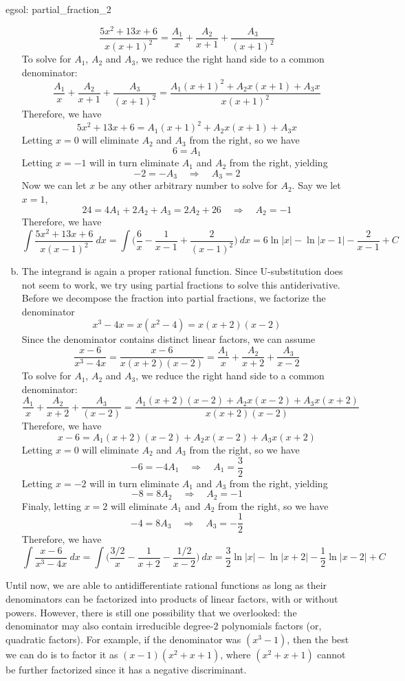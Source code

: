 \begin{egsol}[]{egsol: partial_fraction_2}
\begin{enumerate}[a)]
        \[\frac{5x^2+13x+6}{x(x+1)^2} = \frac{A_1}{x} + \frac{A_2}{x+1} + \frac{A_3}{(x+1)^2}\]
        To solve for $A_1$, $A_2$ and $A_3$, we reduce the right hand side to a common denominator:
        \[\frac{A_1}{x} + \frac{A_2}{x+1} + \frac{A_3}{(x+1)^2} = \frac{A_1(x+1)^2+A_2x(x+1)+A_3x}{x(x+1)^2}\]
        Therefore, we have
        \[5x^2 + 13x + 6 = A_1(x+1)^2+A_2x(x+1)+A_3x\]
        Letting $x = 0$ will eliminate $A_2$ and $A_3$ from the right, so we have 
        \[6 = A_1\]
        Letting $x = -1$ will in turn eliminate $A_1$ and $A_2$ from the right, yielding
        \[-2 = -A_3 \quad \Rightarrow \quad A_3 = 2\]
        Now we can let $x$ be any other arbitrary number to solve for $A_2$.  Say we let $x=1$,
        \[24 = 4A_1 + 2A_2 + A_3 = 2A_2 + 26 \quad \Rightarrow \quad A_2 = -1\]
        Therefore, we have 
        \[\int \frac{5x^2+13x+6}{x(x-1)^2}~dx = \int \Big(\frac{6}{x}-\frac{1}{x-1}+\frac{2}{(x-1)^2}\Big)~dx = 6\ln|x| - \ln|x-1| - \frac{2}{x-1} + C\]
        \item The integrand is again a proper rational function.  Since U-substitution does not seem to work, we try using partial fractions to solve this antiderivative.  Before we decompose the fraction into partial fractions, we factorize the denominator
        \[x^3-4x = x(x^2-4) = x(x+2)(x-2)\]
        Since the denominator contains distinct linear factors, we can assume
        \[\frac{x-6}{x^3-4x} = \frac{x-6}{x(x+2)(x-2)} = \frac{A_1}{x} + \frac{A_2}{x+2} + \frac{A_3}{x-2}\]
        To solve for $A_1$, $A_2$ and $A_3$, we reduce the right hand side to a common denominator:
        \[\frac{A_1}{x} + \frac{A_2}{x+2} + \frac{A_3}{(x-2)} = \frac{A_1(x+2)(x-2)+A_2x(x-2)+A_3x(x+2)}{x(x+2)(x-2)}\]
        Therefore, we have
        \[x-6 = A_1(x+2)(x-2)+A_2x(x-2)+A_3x(x+2)\]
        Letting $x = 0$ will eliminate $A_2$ and $A_3$ from the right, so we have 
        \[-6 = -4A_1 \quad \Rightarrow \quad A_1 = \frac{3}{2}\]
        Letting $x = -2$ will in turn eliminate $A_1$ and $A_3$ from the right, yielding
        \[-8 = 8A_2 \quad \Rightarrow \quad A_2 = -1\]
        Finaly, letting $x = 2$ will eliminate $A_1$ and $A_2$ from the right, so we have 
        \[-4 = 8A_3 \quad \Rightarrow \quad A_3 = -\frac{1}{2}\]
        Therefore, we have 
        \[\int \frac{x-6}{x^3-4x}~dx = \int \Big(\frac{3/2}{x}-\frac{1}{x+2}-\frac{1/2}{x-2}\Big)~dx = \frac{3}{2}\ln |x| - \ln |x+2| - \frac{1}{2}\ln |x-2| + C\]
    \end{enumerate}
\end{egsol}
Until now, we are able to antidifferentiate rational functions as long as their denominators can be factorized into products of linear factors, with or without powers.  However, there is still one possibility that we overlooked: the denominator may also contain irreducible degree-$2$ polynomials factors (or, quadratic factors).  For example, if the denominator was $(x^3-1)$, then the best we can do is to factor it as $(x-1)(x^2+x+1)$, where $(x^2+x+1)$ cannot be further factorized since it has a negative discriminant.  

